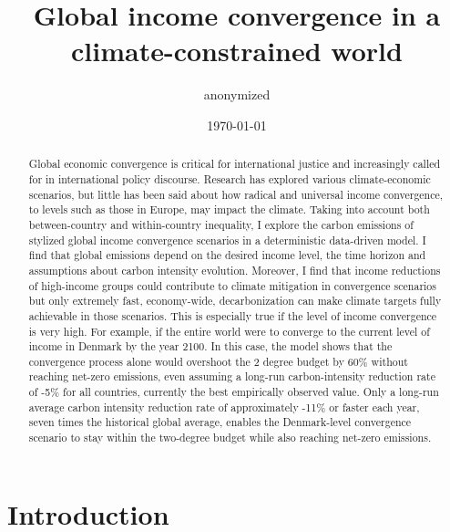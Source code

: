\documentclass{article}
\title{\textbf{Global income convergence in a climate-constrained world}}
\author[1]{anonymized}}
\date{\monthyeardate\today}
\begin{document}
\maketitle

\begin{abstract}

Global economic convergence is critical for international justice and increasingly called for in international policy discourse. Research has explored various climate-economic scenarios, but little has been said about how radical and universal income convergence, to levels such as those in Europe, may impact the climate. Taking into account both between-country and within-country inequality, I explore the carbon emissions of stylized global income convergence scenarios in a deterministic data-driven model. I find that global emissions depend on the desired income level, the time horizon and assumptions about carbon intensity evolution. Moreover, I find that income reductions of high-income groups could contribute to climate mitigation in convergence scenarios but only extremely fast, economy-wide, decarbonization can make climate targets fully achievable in those scenarios. This is especially true if the level of income convergence is very high. For example, if the entire world were to converge to the current level of income in Denmark by the year 2100. In this case, the model shows that the convergence process alone would overshoot the 2 degree budget by 60\% without reaching net-zero emissions, even assuming a long-run carbon-intensity reduction rate of -5\% for all countries, currently the best empirically observed value. Only a long-run average carbon intensity reduction rate of approximately -11\% or faster each year, seven times the historical global average, enables the Denmark-level convergence scenario to stay within the two-degree budget while also reaching net-zero emissions. 

\end{abstract}
\section{Introduction}
\end{document}
